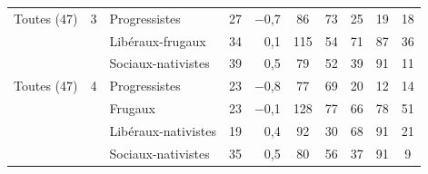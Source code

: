 {\begin{tabular}{lclcrccccc}
\midrule
Toutes (47) & 3 & \cellcolor{cleft!15}Progressistes & \cellcolor{cleft!15}27 & \cellcolor{cleft!15}$-$0,7\hspace{1em} & \cellcolor{cleft!15}86 & \cellcolor{cleft!15}73 & \cellcolor{cleft!15}25 & \cellcolor{cleft!15}19 & \cellcolor{cleft!15}18 \\
 &  & \cellcolor{cdjc!15}Libéraux-frugaux & \cellcolor{cdjc!15}34 & \cellcolor{cdjc!15}0,1\hspace{1em} & \cellcolor{cdjc!15}115 & \cellcolor{cdjc!15}54 & \cellcolor{cdjc!15}71 & \cellcolor{cdjc!15}87 & \cellcolor{cdjc!15}36 \\
 &  & \cellcolor{ced!15}Sociaux-nativistes & \cellcolor{ced!15}39 & \cellcolor{ced!15}0,5\hspace{1em} & \cellcolor{ced!15}79 & \cellcolor{ced!15}52 & \cellcolor{ced!15}39 & \cellcolor{ced!15}91 & \cellcolor{ced!15}11 \\
\midrule
Toutes (47) & 4 & \cellcolor{cleft!15}Progressistes & \cellcolor{cleft!15}23 & \cellcolor{cleft!15}$-$0,8\hspace{1em} & \cellcolor{cleft!15}77 & \cellcolor{cleft!15}69 & \cellcolor{cleft!15}20 & \cellcolor{cleft!15}12 & \cellcolor{cleft!15}14 \\
 &  & \cellcolor{cfrug!15}Frugaux & \cellcolor{cfrug!15}23 & \cellcolor{cfrug!15}$-$0,1\hspace{1em} & \cellcolor{cfrug!15}128 & \cellcolor{cfrug!15}77 & \cellcolor{cfrug!15}66 & \cellcolor{cfrug!15}78 & \cellcolor{cfrug!15}51 \\
 &  & \cellcolor{ccdroit!15}Libéraux-nativistes & \cellcolor{ccdroit!15}19 & \cellcolor{ccdroit!15}0,4\hspace{1em} & \cellcolor{ccdroit!15}92 & \cellcolor{ccdroit!15}30 & \cellcolor{ccdroit!15}68 & \cellcolor{ccdroit!15}91 & \cellcolor{ccdroit!15}21 \\
 &  & \cellcolor{ced!15}Sociaux-nativistes & \cellcolor{ced!15}35 & \cellcolor{ced!15}0,5\hspace{1em} & \cellcolor{ced!15}80 & \cellcolor{ced!15}56 & \cellcolor{ced!15}37 & \cellcolor{ced!15}91 & \cellcolor{ced!15}9 \\
\bottomrule
\end{tabular}}
